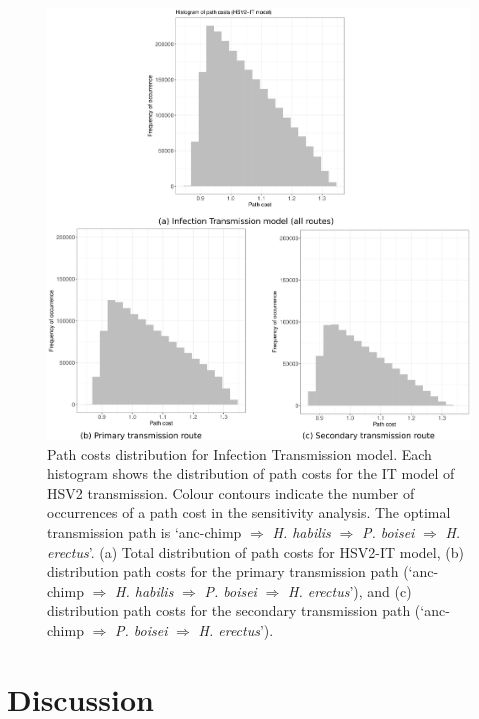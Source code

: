 \documentclass[fleqn,10pt]{wlscirep}
\begin{document}
\begin{figure}[!htbp]
  \centering
  \includegraphics[width=\textwidth]{figs/gamma_path_costs}
  \caption{Path costs distribution for Infection Transmission model. Each histogram shows the distribution of path costs for the IT model of HSV2 transmission. Colour contours indicate the number of occurrences of a path cost in the sensitivity analysis. The optimal transmission path is ‘anc-chimp $\Rightarrow$ \textit{H. habilis} $\Rightarrow$ \textit{P. boisei} $\Rightarrow$ \textit{H. erectus}’. (a) Total distribution of path costs for HSV2-IT model, (b) distribution path costs for the primary transmission path (‘anc-chimp $\Rightarrow$ \textit{H. habilis} $\Rightarrow$ \textit{P. boisei} $\Rightarrow$ \textit{H. erectus}’), and (c) distribution path costs for the  secondary transmission path (‘anc-chimp $\Rightarrow$ \textit{P. boisei} $\Rightarrow$ \textit{H. erectus}’).}
  \label{fig:gamma}   
\end{figure}     


\section*{Discussion}
\end{document}

